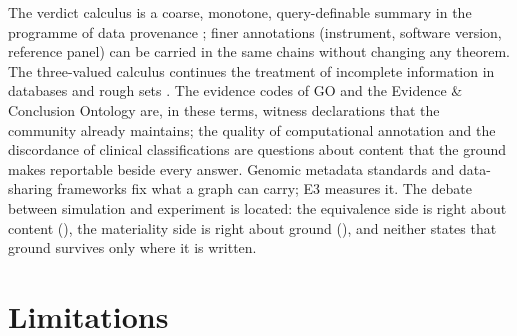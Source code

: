 \documentclass[11pt,twocolumn,a4paper]{article}
\theoremstyle{plain}
\theoremstyle{definition}
\theoremstyle{remark}
\begin{document}
The verdict calculus is a coarse, monotone, query-definable summary in the
programme of data provenance \citep{buneman2001,green2007,cheney2009}; finer
annotations (instrument, software version, reference panel) can be carried in
the same chains without changing any theorem. The three-valued calculus
continues the treatment of incomplete information in databases
\citep{codd1979,imielinski1984,libkin2016,reiter1978} and rough sets
\citep{pawlak1982,kryszkiewicz1998}. The evidence codes of GO and the Evidence
\& Conclusion Ontology \citep{giglio2019} are, in these terms, witness
declarations that the community already maintains; the quality of computational
annotation \citep{skunca2012,schnoes2009} and the discordance of clinical
classifications \citep{yang2017,harrison2017} are questions about content that
the ground makes reportable beside every answer. Genomic metadata standards
\citep{field2008,yilmaz2011,sansone2012,eloefadrosh2022} and data-sharing
frameworks \citep{rehm2021,wagner2021,wilkinson2016} fix what a graph can carry;
E3 measures it. The debate between simulation and experiment
\citep{morrison2009,parker2009,guala2002,morgan2005} is located: the equivalence
side is right about content (), the materiality side is
right about ground (), and neither states
that ground survives only where it is written.

\section{Limitations}
\label{sec:limits}
\end{document}
